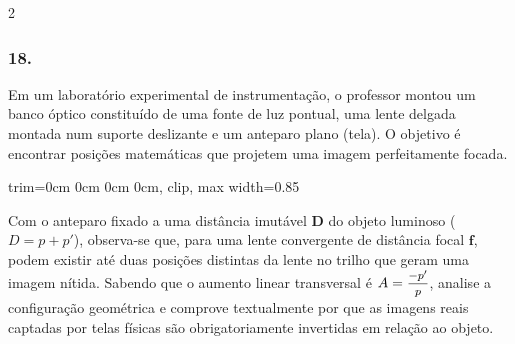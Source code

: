 \documentclass[twoside, 10pt, a4paper]{article}
\newlength{\espacoQuestao}\setlength{\espacoQuestao}{0.2cm}
\newcommand{\larguraTikz}{0.85\linewidth}
\begin{document}
\begin{multicols*}{2}
\subsubsection*{18.} Em um laboratório experimental de instrumentação, o professor montou um banco óptico constituído de uma fonte de luz pontual, uma lente delgada montada num suporte deslizante e um anteparo plano (tela). O objetivo é encontrar posições matemáticas que projetem uma imagem perfeitamente focada.
\begin{center}
\begin{adjustbox}{trim=0cm 0cm 0cm 0cm, clip, max width=\larguraTikz}
\end{adjustbox}
\end{center}
Com o anteparo fixado a uma distância imutável $ \textbf{D} $ do objeto luminoso ($ D = p + p' $), observa-se que, para uma lente convergente de distância focal $ \textbf{f} $, podem existir até duas posições distintas da lente no trilho que geram uma imagem nítida. Sabendo que o aumento linear transversal é $ A = \mfrac{-p'}{p} $, analise a configuração geométrica e comprove textualmente por que as imagens reais captadas por telas físicas são obrigatoriamente invertidas em relação ao objeto.
\par\vspace{\espacoQuestao}


\end{multicols*}
\end{document}
